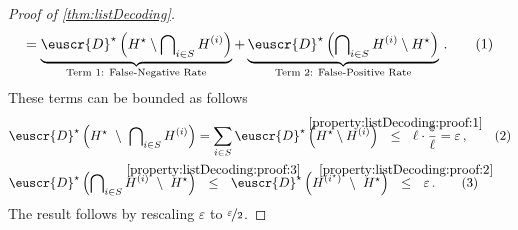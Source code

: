 \documentclass[11pt]{article}
\theoremstyle{plain}
\theoremstyle{definition}
\theoremstyle{remark}
\newcommand{\yesnum}{\addtocounter{equation}{1}\tag{\theequation}}
\newcommand{\Stackrel}[2]{\stackrel{\mathmakebox[\widthof{\ensuremath{#2}}]{#1}}{#2}}
\newcommand{\inparen}[1]{\left(#1\right)}
\newcommand{\nfrac}[2]{\nicefrac{#1}{#2}}
\newcommand{\eps}{\varepsilon}
\newcommand{\customcal}[1]{\euscr{#1}}
\newcommand{\cD}{\customcal{D}}
\newcommand{\optset}{{H^\star}}
\newcommand{\cDtrue}{\cD^\star}
\begin{document}
\begin{proof}[Proof of \cref{thm:listDecoding}]
\[                        = 
                        \underbrace{\cDtrue\inparen{\optset \setminus \bigcap\nolimits_{i\in S} H^{(i)}}}_{\text{Term 1: False-Negative Rate}}
                        + 
                       \underbrace{ \cDtrue\inparen{\bigcap\nolimits_{i\in S} H^{(i)} \setminus \optset}}_{\text{Term 2: False-Positive Rate}}\,.
                        \yesnum\label{eq:listDecoding:1}
                    \]
                    These terms can be bounded as follows
                    \begin{align*}
                        \cDtrue\inparen{\optset~\setminus~ \bigcap\nolimits_{i\in S} H^{(i)}}
                     &=\sum_{i\in S} \cDtrue \inparen{\optset\setminus H^{(i)}}
                     ~~\Stackrel{{\rm \ref{property:listDecoding:proof:1}}}{\leq}~~ \ell \cdot \frac{\eps}{\ell}
                     = \eps\,,
                        \yesnum\label{eq:listDecoding:2}\\
                     \cDtrue\inparen{\bigcap\nolimits_{i\in S} H^{(i)}~\setminus~\optset}
                        &~~\Stackrel{\rm\ref{property:listDecoding:proof:3}}{\leq}~~ \cDtrue\inparen{H^{(i^\star)}~\setminus~\optset}
                        ~~\Stackrel{\rm\ref{property:listDecoding:proof:2}}{\leq}~~
                            \eps\,.\yesnum\label{eq:listDecoding:3}
                    \end{align*} 
                The result follows by rescaling $\eps$ to $\nfrac{\eps}{2}$.


\end{proof}
\end{document}
